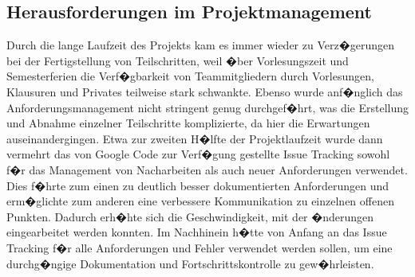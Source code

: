 \documentclass[a4paper,12pt]{scrartcl}
\begin{document}
\subsection{Herausforderungen im Projektmanagement}

Durch die lange Laufzeit des Projekts kam es immer wieder zu Verz�gerungen bei der Fertigstellung von Teilschritten, weil �ber Vorlesungszeit und Semesterferien die Verf�gbarkeit von Teammitgliedern durch Vorlesungen, Klausuren und Privates teilweise stark schwankte. Ebenso wurde anf�nglich das Anforderungsmanagement nicht stringent genug durchgef�hrt, was die Erstellung und Abnahme einzelner Teilschritte komplizierte, da hier die Erwartungen auseinandergingen. Etwa zur zweiten H�lfte der Projektlaufzeit wurde dann vermehrt das von Google Code zur Verf�gung gestellte Issue Tracking sowohl f�r das Management von Nacharbeiten als auch neuer Anforderungen verwendet. Dies f�hrte zum einen zu deutlich besser dokumentierten Anforderungen und erm�glichte zum anderen eine verbessere Kommunikation zu einzelnen offenen Punkten. Dadurch erh�hte sich die Geschwindigkeit, mit der �nderungen eingearbeitet werden konnten. Im Nachhinein h�tte von Anfang an das Issue Tracking f�r alle Anforderungen und Fehler verwendet werden sollen, um eine durchg�ngige Dokumentation und Fortschrittskontrolle zu gew�hrleisten.
\end{document}
